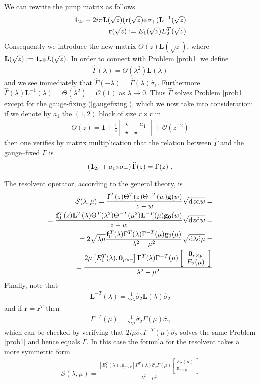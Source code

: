 \documentclass{article}
\def\L{{\mathbf L}}
\def\ot{\hbox{\resizebox{6pt}{!}{$ \otimes \,
$}}}
\def\r{ {\mathbf r}}
\def\s{\sigma}
\def\d{{\rm d}}
\def\1{\mathbf 1}
\def\wh{\widehat}
\def\0{{\mathbf 0}}
\newcommand{\be}{\begin{eqnarray}}
\newcommand{\ee}{\end{eqnarray}}
\def\le{\left}
\def\ri{\right}
\begin{document}
We can rewrite the jump matrix as follows 
\be
\1_{2r}  - 2i\pi \L(\sqrt{z} )  (\r(\sqrt z) \ot  \s_+) \L^{-1}(\sqrt{z}) \\
\r(\sqrt{z}):= 
E_1(\sqrt{z}) E_2^T(\sqrt{z})  
\ee
Consequently we introduce the new matrix $\Theta(z ) \L(\sqrt{z} )$, where $\L(\sqrt{z}):= \1_r \ot  L(\sqrt z)$. 
In order to connect with Problem \ref{prob1} we define 
\be
\wh \Gamma(\lambda) = 
\Theta(\lambda^2 ) \L(\lambda) 
\ee
and we see immediately that $\wh \Gamma(-\lambda) = \wh \Gamma(\lambda) \wh \s_1$. Furthermore $\wh \Gamma(\lambda) \L^{-1}(\lambda) =\Theta(\lambda^2)= \mathcal O(1)$ as $\lambda\to 0$.
Thus $\wh \Gamma$ solves Problem \ref{prob1} except for the gauge-fixing (\ref{gaugefixing}), which we now take into consideration:
if we denote by $a_1$ the $(1,2)$ block of size $r\times r$ in 
\be
\Theta(z) = \1 + \frac 1 z \le[
\begin{array}{c|c}
\star &- a_1\\
\hline 
\star & \star
\end{array}
\ri] + \mathcal O(z^{-2})
\ee
then one verifies by matrix multiplication that the relation between $\wh \Gamma$ and the gauge--fixed $\Gamma$ is 
\be
\le(
\1_{2r} + a_1 \ot  \s_+
\ri)\wh \Gamma(z) =  \Gamma(z)\ ,
\ee


The resolvent operator, according to the general theory, is 
\be
\mathcal S(\lambda,\mu) = \frac{{\bf f}^T(z) \Theta^{T}(z) \Theta^{-T}(w){\bf g }(w)}{z-w } \sqrt{\d z\d w} = \\
=\frac {{\bf f}_0^T(z) \L^T(\lambda)\Theta^{T}(\lambda^2) \Theta^{-T}(\mu^2)\L^{-T}(\mu) {\bf g_0}(w)}{z-w} \sqrt{\d z\d w} =\\
=2\sqrt{\lambda\mu}\frac {{\bf f}_0^T(\lambda) \Gamma^{T}(\lambda) \Gamma^{-T}(\mu) {\bf g }_0(\mu)}{\lambda^2-\mu^2} \sqrt{\d \lambda\d \mu} =\\
=
\frac {2 \mu \le[
 E_1^T(\lambda) 
,
\0_{p\times r}
 \ri] \Gamma^{T}(\lambda) \Gamma^{-T}(\mu) 
\le[\begin{array}{c}
\0_{r\times p} 
\\
E_2(\mu)
\end{array} \ri]}{\lambda^2  - \mu^2}
\ee
Finally, note that
\be
\L^{-T}(\lambda) =\frac 1{2i\lambda}\wh \s_2  \L(\lambda ) \wh \s_2 
\ee
and if  $\r=\r^T$ then 
\be
\Gamma^{-T} (\mu) =\frac 1{2i\mu}\wh \s_2 \Gamma (\mu) \wh \s_2
\ee
which can be checked by verifying that ${2i\mu}\wh \s_2 \Gamma^{-T} (\mu) \wh \s_2$ solves the same Problem \ref{prob1} and hence equals $\Gamma$.
In this case the formula for the resolvent takes a more symmetric form 
\be
\mathcal S(\lambda,\mu) =
\frac {
 \le[
  E_1^T(\lambda) 
 , 
 \0_{p\times r}
 \ri] \Gamma^{T}(\lambda) \wh \s_2 \Gamma (\mu) 
\le[\begin{array}{c}
  E_2(\mu)
\\
\0_{r\times p} 
\end{array} \ri]}{\lambda^2  - \mu^2}
\ee
\end{document}

